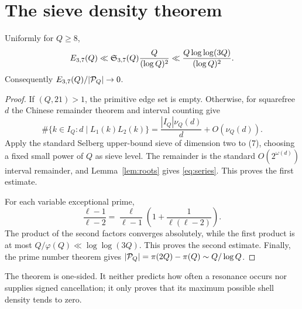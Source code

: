 \section{The sieve density theorem}

\begin{theorem}\label{thm:3716}
Uniformly for $Q\ge8$,
\[
 E_{3,7}(Q)\ll \mathfrak S_{3,7}(Q)\frac{Q}{(\log Q)^2}
 \ll \frac{Q\log\log(3Q)}{(\log Q)^2}.
\]
Consequently $E_{3,7}(Q)/|\mathcal P_Q|\to0$.
\end{theorem}

\begin{proof}
If $(Q,21)>1$, the primitive edge set is empty.  Otherwise, for squarefree $d$ the
Chinese remainder theorem and interval counting give
\[
 \#\{k\in I_Q:d\mid L_1(k)L_2(k)\}
 =\frac{|I_Q|\nu_Q(d)}d+O(\nu_Q(d)).                 \tag{7}
\]
Apply the standard Selberg upper-bound sieve of dimension two to (7), choosing a
fixed small power of $Q$ as sieve level.  The remainder is the standard
$O(2^{\omega(d)})$ interval remainder, and Lemma~\ref{lem:roots} gives
\eqref{eq:series}.  This proves the first estimate.

For each variable exceptional prime,
\[
 \frac{\ell-1}{\ell-2}
 =\frac{\ell}{\ell-1}
  \left(1+\frac{1}{\ell(\ell-2)}\right).
\]
The product of the second factors converges absolutely, while the first product is
at most $Q/\varphi(Q)\ll\log\log(3Q)$.  This proves the second estimate.  Finally,
the prime number theorem gives $|\mathcal P_Q|=\pi(2Q)-\pi(Q)\sim Q/\log Q$.
\end{proof}

The theorem is one-sided.  It neither predicts how often a resonance occurs nor
supplies signed cancellation; it only proves that its maximum possible shell density
tends to zero.

